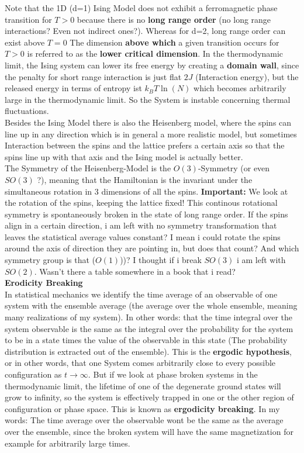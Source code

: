	Note that the 1D (d=1) Ising Model does not exhibit a ferromagnetic phase transition for $T > 0$ because there is no \textbf{long range order} (no long range interactions? Even not indirect ones?). Whereas for d=2, long range order can exist above $ T = 0$ The dimension \textbf{above which} a given transition occurs for $T > 0$ is referred to as the \textbf{lower critical dimension}. In the thermodynamic limit, the Ising system can lower its free energy by creating a \textbf{domain wall}, since the penalty for short range interaction is just flat $2J$ (Interaction energy), but the released energy in terms of entropy ist $k_B T \ln(N)$ which becomes arbitrarily large in the thermodynamic limit. So the System is instable concerning thermal fluctuations. \\
	
	Besides the Ising Model there is also the Heisenberg model, where the spins can line up in any direction which is in general a more realistic model, but sometimes Interaction between the spins and the lattice prefers a certain axis so that the spins line up with that axis and the Ising model is actually better. \\
	
	The Symmetry of the Heisenberg-Model is the $O(3)$-Symmetry (or even $SO(3)$ ?), meaning that the Hamiltonian is the invariant under the simultaneous rotation in 3 dimensions of all the spins. \textbf{Important:} We look at the rotation of the spins, keeping the lattice fixed! This continous rotational symmetry is spontaneously broken in the state of long range order. If the spins align in a certain direction, i am left with no symmetry transformation that leaves the statistical average values constant? I mean i could rotate the spins around the axis of direction they are pointing in, but does that count? And which symmetry group is that ($O(1)$))? I thought if i break $SO(3)$ i am left with $SO(2)$. Wasn't there a table somewhere in a book that i read? \\
	
	\textbf{Erodicity Breaking} \\
	In statistical mechanics we identify the time average of an observable of one system with the ensemble average (the average over the whole ensemble, meaning many realizations of my system). In other words: that the time integral over the system observable is the same as the integral over the probability for the system to be in a state times the value of the observable in this state (The probability distribution is extracted out of the ensemble). This is the \textbf{ergodic hypothesis}, or in other words, that one System comes arbitrarily close to every possible configuration as $t \rightarrow \infty$. But if we look at phase broken systems in the thermodynamic limit, the lifetime of one of the degenerate ground states will grow to infinity, so the system is effectively trapped in one or the other region of configuration or phase space. This is known as \textbf{ergodicity breaking}. In my words: The time average over the observable wont be the same as the average over the ensemble, since the broken system will have the same magnetization for example for arbitrarily large times. \\
	
